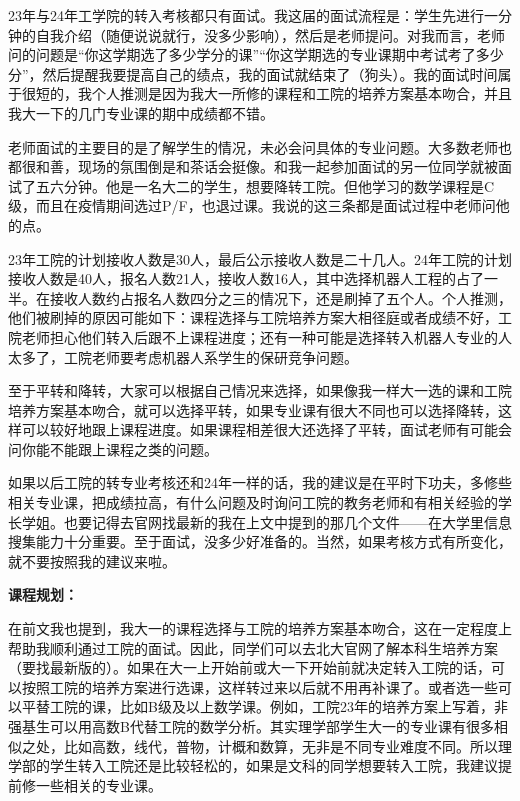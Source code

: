 \vspace{10pt}

23年与24年工学院的转入考核都只有面试。我这届的面试流程是：学生先进行一分钟的自我介绍（随便说说就行，没多少影响），然后是老师提问。对我而言，老师问的问题是“你这学期选了多少学分的课”“你这学期选的专业课期中考试考了多少分”，然后提醒我要提高自己的绩点，我的面试就结束了（狗头）。我的面试时间属于很短的，我个人推测是因为我大一所修的课程和工院的培养方案基本吻合，并且我大一下的几门专业课的期中成绩都不错。

\vspace{10pt}

老师面试的主要目的是了解学生的情况，未必会问具体的专业问题。大多数老师也都很和善，现场的氛围倒是和茶话会挺像。和我一起参加面试的另一位同学就被面试了五六分钟。他是一名大二的学生，想要降转工院。但他学习的数学课程是C级，而且在疫情期间选过P/F，也退过课。我说的这三条都是面试过程中老师问他的点。

\vspace{10pt}

23年工院的计划接收人数是30人，最后公示接收人数是二十几人。24年工院的计划接收人数是40人，报名人数21人，接收人数16人，其中选择机器人工程的占了一半。在接收人数约占报名人数四分之三的情况下，还是刷掉了五个人。个人推测，他们被刷掉的原因可能如下：课程选择与工院培养方案大相径庭或者成绩不好，工院老师担心他们转入后跟不上课程进度；还有一种可能是选择转入机器人专业的人太多了，工院老师要考虑机器人系学生的保研竞争问题。

\vspace{10pt}

至于平转和降转，大家可以根据自己情况来选择，如果像我一样大一选的课和工院培养方案基本吻合，就可以选择平转，如果专业课有很大不同也可以选择降转，这样可以较好地跟上课程进度。如果课程相差很大还选择了平转，面试老师有可能会问你能不能跟上课程之类的问题。

\vspace{10pt}

如果以后工院的转专业考核还和24年一样的话，我的建议是在平时下功夫，多修些相关专业课，把成绩拉高，有什么问题及时询问工院的教务老师和有相关经验的学长学姐。也要记得去官网找最新的我在上文中提到的那几个文件——在大学里信息搜集能力十分重要。至于面试，没多少好准备的。当然，如果考核方式有所变化，就不要按照我的建议来啦。

\textbf{课程规划：}

在前文我也提到，我大一的课程选择与工院的培养方案基本吻合，这在一定程度上帮助我顺利通过工院的面试。因此，同学们可以去北大官网了解本科生培养方案（要找最新版的）。如果在大一上开始前或大一下开始前就决定转入工院的话，可以按照工院的培养方案进行选课，这样转过来以后就不用再补课了。或者选一些可以平替工院的课，比如B级及以上数学课。例如，工院23年的培养方案上写着，非强基生可以用高数B代替工院的数学分析。其实理学部学生大一的专业课有很多相似之处，比如高数，线代，普物，计概和数算，无非是不同专业难度不同。所以理学部的学生转入工院还是比较轻松的，如果是文科的同学想要转入工院，我建议提前修一些相关的专业课。

